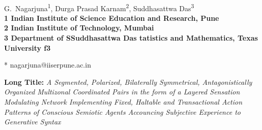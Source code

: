 \documentclass[10pt,letterpaper]{article}
\begin{document}
\vspace*{0.35in}

\begin{flushleft}
{\Large
\textbf{}
}
\newline
\\
G.~Nagarjuna\textsuperscript{1},
Durga Prasad Karnam\textsuperscript{2},
Suddhasattwa Das\textsuperscript{3}
\\
\bigskip
\bf{1} Indian Institute of Science Education and Research, Pune
\\
\bf{2} Indian Institute of Technology, Mumbai
\\
\bf{3} Department of SSuddhasattwa Das
tatistics and Mathematics, Texas University
f{3} 

\bigskip
* nagarjuna@iiserpune.ac.in

\end{flushleft}
\noindent \textbf{Long Title:} \textit{A Segmented, Polarized,
  Bilaterally Symmetrical, Antagonistically Organized Multizonal
  Coordinated Pairs in the form of a Layered Sensation Modulating
  Network Implementing Fixed, Haltable and Transactional Action
  Patterns of Conscious Semiotic Agents Accouncing Subjective
  Experience to Generative Syntax}













\end{document}
